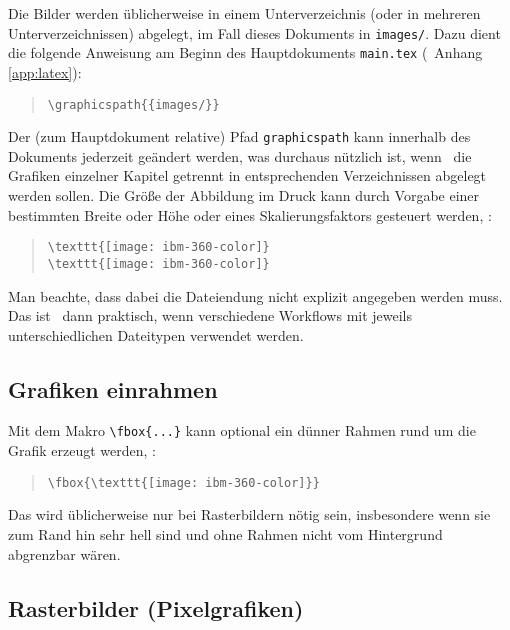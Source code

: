 Die Bilder werden üblicherweise in einem Unterverzeichnis (oder in mehreren Unterverzeichnissen) abgelegt,
im Fall dieses Dokuments in \nolinkurl{images/}.
Dazu dient die folgende Anweisung
am Beginn des Hauptdokuments \nolinkurl{main.tex} (\sa\ Anhang \ref{app:latex}):
%
\begin{quote}
\verb!\graphicspath{{images/}}!
\end{quote}
%
Der (zum Hauptdokument relative) Pfad \texttt{graphicspath} kann innerhalb des
Dokuments jederzeit geändert werden, was durchaus nützlich ist, wenn
\zB\ die Grafiken einzelner Kapitel getrennt in entsprechenden Verzeichnissen
abgelegt werden sollen.
Die Größe der Abbildung im Druck kann durch Vorgabe einer bestimmten
Breite oder Höhe oder eines Skalierungsfaktors gesteuert werden, {\zB}:
%
\begin{quote}
\verb!\texttt{[image: ibm-360-color]}! \\
\verb!\texttt{[image: ibm-360-color]}!
\end{quote}
%
Man beachte, dass dabei die Dateiendung nicht explizit angegeben werden muss. 
Das ist \va\ dann praktisch, wenn verschiedene Workflows mit jeweils
unterschiedlichen Dateitypen verwendet werden.


\subsection{Grafiken einrahmen} 

Mit dem Makro \verb!\fbox{...}! kann optional ein dünner 
Rahmen rund um die Grafik erzeugt werden, \zB:
%
\begin{quote}
\verb!\fbox{\texttt{[image: ibm-360-color]}}!
\end{quote}
%
Das wird üblicherweise nur bei Rasterbildern nötig sein, insbesondere wenn sie zum Rand hin sehr hell sind
und ohne Rahmen nicht vom Hintergrund abgrenzbar wären.

\subsection{Rasterbilder (Pixelgrafiken)}

